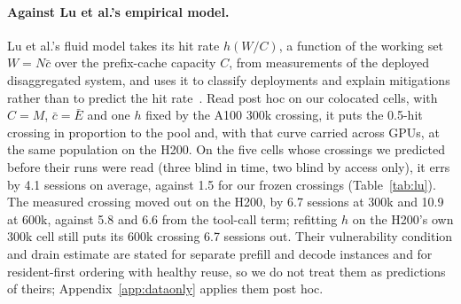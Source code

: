 \paragraph{Against Lu et al.'s empirical model.} Lu et al.'s fluid model takes its hit rate $h(W/C)$, a function of the working set
$W=N\bar c$ over the prefix-cache capacity $C$, from measurements of the deployed disaggregated system, and uses it to classify
deployments and explain mitigations rather than to predict the hit rate~\citep{lu2026cachetrap}. Read post hoc on our colocated
cells, with $C=M$, $\bar c=\bar E$ and one $h$ fixed by the A100 300k crossing, it puts the 0.5-hit crossing in proportion to the pool
and, with that curve carried across GPUs, at the same population on the H200. On the five cells whose crossings we predicted
before their runs were read (three blind in time, two blind by access only), it errs by 4.1 sessions on average, against 1.5 for our
frozen crossings (Table~\ref{tab:lu}). The measured crossing moved out on the H200, by 6.7 sessions at 300k and 10.9 at 600k, against
5.8 and 6.6 from the tool-call term; refitting $h$ on the H200's own 300k cell still puts its 600k crossing 6.7 sessions out. Their
vulnerability condition and drain estimate are stated for separate prefill and decode instances and for resident-first ordering
with healthy reuse, so we do not treat them as predictions of theirs; Appendix~\ref{app:dataonly} applies them post hoc.
